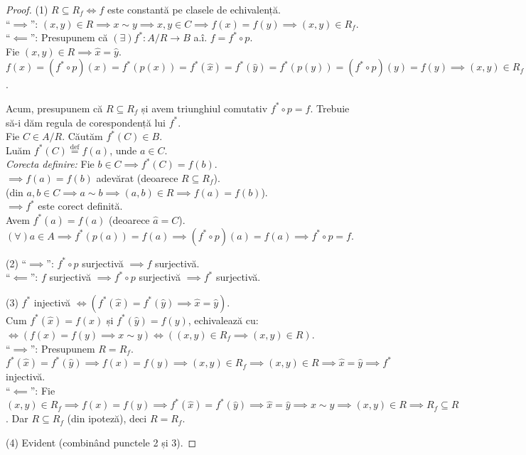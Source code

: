 \begin{proof}
(1) $R \subseteq R_f \iff f$ este constantă pe clasele de echivalență. \\
``$\implies$'': $(x,y) \in R \implies x \sim y \implies x, y \in C \implies f(x) = f(y) \implies (x,y) \in R_f$. \\
``$\impliedby$'': Presupunem că $(\exists) f^*: A/R \rightarrow B$ a.î. $f = f^* \circ p$. \\
Fie $(x,y) \in R \implies \hat{x} = \hat{y}$. \\
$f(x) = (f^* \circ p)(x) = f^*(p(x)) = f^*(\hat{x}) = f^*(\hat{y}) = f^*(p(y)) = (f^* \circ p)(y) = f(y) \implies (x,y) \in R_f$.

Acum, presupunem că $R \subseteq R_f$ și avem triunghiul comutativ $f^* \circ p = f$. Trebuie să-i dăm regula de corespondență lui $f^*$. \\
Fie $C \in A/R$. Căutăm $f^*(C) \in B$. \\
Luăm $f^*(C) \overset{\text{def}}{=} f(a)$, unde $a \in C$. \\
\textit{Corecta definire:} Fie $b \in C \implies f^*(C) = f(b)$. \\
$\implies f(a) = f(b)$ adevărat (deoarece $R \subseteq R_f$). \\
(din $a,b \in C \implies a \sim b \implies (a,b) \in R \implies f(a) = f(b)$). \\
$\implies f^*$ este corect definită. \\
Avem $f^*(\hat{a}) = f(a)$ (deoarece $\hat{a} = C$). \\
$(\forall) a \in A \implies f^*(p(a)) = f(a) \implies (f^* \circ p)(a) = f(a) \implies f^* \circ p = f$.

(2) 
``$\implies$'': $f^* \circ p$ surjectivă $\implies f$ surjectivă. \\
``$\impliedby$'': $f$ surjectivă $\implies f^* \circ p$ surjectivă $\implies f^*$ surjectivă.

(3) $f^*$ injectivă $\iff \left( f^*(\hat{x}) = f^*(\hat{y}) \implies \hat{x} = \hat{y} \right)$. \\
Cum $f^*(\hat{x}) = f(x)$ și $f^*(\hat{y}) = f(y)$, echivalează cu: \\
$\iff \left( f(x) = f(y) \implies x \sim y \right) \iff \left( (x,y) \in R_f \implies (x,y) \in R \right)$. \\
``$\implies$'': Presupunem $R = R_f$. \\
$f^*(\hat{x}) = f^*(\hat{y}) \implies f(x) = f(y) \implies (x,y) \in R_f \implies (x,y) \in R \implies \hat{x} = \hat{y} \implies f^*$ injectivă. \\
``$\impliedby$'': Fie $(x,y) \in R_f \implies f(x) = f(y) \implies f^*(\hat{x}) = f^*(\hat{y}) \implies \hat{x} = \hat{y} \implies x \sim y \implies (x,y) \in R \implies R_f \subseteq R$. Dar $R \subseteq R_f$ (din ipoteză), deci $R = R_f$.

(4) Evident (combinând punctele 2 și 3).
\end{proof}

